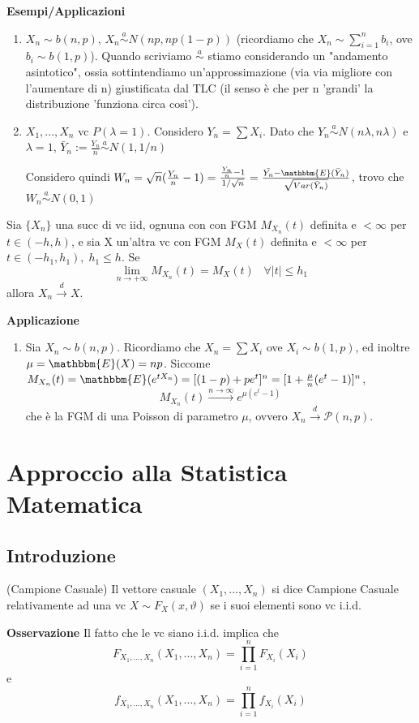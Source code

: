 \textbf{Esempi/Applicazioni}
\begin{enumerate}
\item $X_n \sim b(n,p)$, $X_n \stackrel{a}{\sim}N(np,np(1-p))$ (ricordiamo che $X_n \sim \sum_{i=1}^n b_i$, ove $b_i \sim b(1,p)$).
Quando scriviamo $\stackrel{a}{\sim}$ stiamo considerando un "andamento asintotico", ossia sottintendiamo un'approssimazione (via via migliore con l'aumentare di n) giustificata dal TLC (il senso è che per n 'grandi' la distribuzione 'funziona circa così').
\item $X_1,...,X_n$ vc 
$P(\lambda =1)$. 
Considero $Y_n=\sum X_i$.
Dato che $Y_n \stackrel{a}
{\sim} N(n\lambda ,n \lambda )$ e $\lambda=1$,
 $\bar{Y}_n:=\frac{Y_n}{n} \stackrel{a}
 {\sim} N(1,1/n)$

 Considero quindi $W_n=\sqrt{n}(\frac{Y_n}{n}-1)=\frac{\frac{Y_n}{n}-1}
{1/\sqrt{n}}=\frac{\bar{Y_n} - \mathbbm{E}(\bar{Y}_n)}
{\sqrt{Var(\bar{Y}_n)}}$, trovo che $W_n \stackrel{a}{\sim} N(0,1) $
\end{enumerate}

\begin{teo}
Sia $\{X_n\}$ una succ di vc iid, ognuna con con FGM $M_{X_n}(t)$ definita e $<\infty$ per $t\in(-h,h)$, e sia X un'altra vc con FGM $M_X(t)$ definita e $<\infty$ per $t \in (-h_1,h_1), \; h_1\leq h$. Se $$\lim_{n \rightarrow +\infty} M_{X_n}(t)=M_X(t) \; \; \; \forall |t| \leq h_1$$ allora $X_n \stackrel{d}{\rightarrow} X$.
\end{teo}
\textbf{Applicazione}
\begin{enumerate}
\item Sia $X_n \sim b(n,p)$. 
Ricordiamo che $X_n=\sum X_i$ ove $X_i \sim b(1,p)$, ed inoltre $\mu=\mathbbm{E}(X)=np$.
Siccome $M_{X_n}(t)=
\mathbbm{E}(e^{tX_n})=[(1-p)+pe^t]^n=
[1+\frac{\mu}{n}(e^t - 1)]^n$, 
$$ M_{X_n}(t) \stackrel{n \rightarrow \infty}{\longrightarrow} 
e^{\mu(e^t-1)}$$
che è la FGM di una Poisson di parametro $\mu$, ovvero $X_n \stackrel{d}{\rightarrow} \mathcal{P}(n,p).$
\end{enumerate}
\section{Approccio alla Statistica Matematica}

\subsection{Introduzione}

\begin{definizione} (Campione Casuale)
Il vettore casuale $(X_1,...,X_n)$ si dice Campione Casuale relativamente ad una vc $X \sim F_X(x,\vartheta)$ se i suoi elementi sono vc i.i.d.
\end{definizione}
\textbf{Osservazione}
Il fatto che le vc siano i.i.d. implica che $$F_{X_1,...,X_n}(X_1,...,X_n)=\prod_{i=1}^n F_{X_i} (X_i)$$ e $$f_{X_1,...,X_n}(X_1,...,X_n)=\prod_{i=1}^n f_{X_i} (X_i)$$


